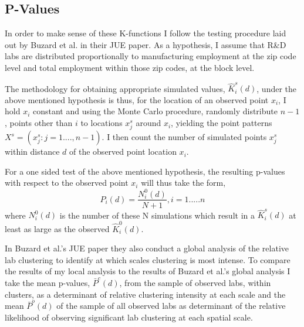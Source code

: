 \documentclass[12pt,letterpaper]{article}
\begin{document}
\subsection{P-Values}
In order to make sense of these K-functions I follow the testing procedure laid out by Buzard et al. in their JUE paper. As a hypothesis, I assume that R\&D labs are distributed proportionally to manufacturing employment at the zip code level and total employment within those zip codes, at the block level.
\par 
The methodology for obtaining appropriate simulated values, \(\hat{K}^{s}_{i}(d)\), under the above mentioned hypothesis is thus, for the location of an observed point \(x_i\), I hold \(x_i\) constant and using the Monte Carlo procedure, randomly distribute \(n-1\), points other than \(i\) to locations \(x_{j}^{s} \) around \(x_i\), yielding the point patterns \(X^{s} = (x^{s}_{j} : j = 1....,n-1)\). I then count the number of simulated points \(x^{s}_{j}\) within distance \(d\) of the observed point location \(x_i\).
\par 
For a one sided test of the above mentioned hypothesis, the resulting p-values with respect to the observed point \(x_i\) will thus take the form, 
\begin{equation}\label{eq:2}
    P_{i}(d) = \frac{N_{i}^{0}(d)}{N + 1}, i = 1.....n
\end{equation}
where \(N_{i}^{0}(d)\) is the number of these N simulations which result in a \(\hat{K}^{s}_{i}(d)\) at least as large as the observed \(\hat{K}_{i}^{0}(d)\).  
\par 
In Buzard et al.'s JUE paper they also conduct a global analysis of the relative lab clustering to identify at which scales clustering is most intense. To compare the results of my local analysis to the results of Buzard et al.'s global analysis I take the mean p-values, \(\bar{P}^c(d)\), from the sample of observed labs, within clusters, as a determinant of relative clustering intensity at each scale and the mean \(\bar{P}^o(d)\) of the sample of all observed labs as determinant of the relative likelihood of observing significant lab clustering at each spatial scale. 
\end{document}
